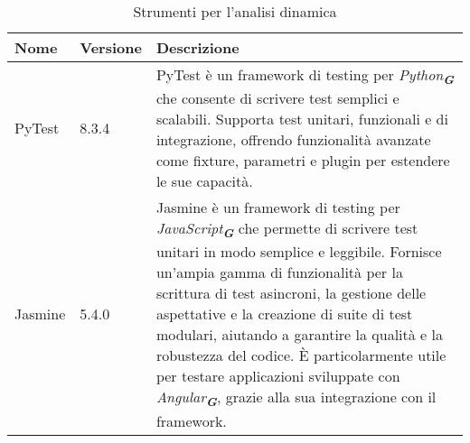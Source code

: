 \newpage

\begin{table}[h!]
    \centering
    \renewcommand{\arraystretch}{1.6} %
    \begin{tabularx}{\textwidth}{|p{2cm}|p{2cm}|X|} \hline
    \rowcolor[HTML]{FFD700} 
    \textbf{Nome} & \textbf{Versione} & \textbf{Descrizione} \\ \hline
    PyTest & 8.3.4 & PyTest è un framework di testing per \emph{Python}\textsubscript{\textbf{\textit{G}}} che consente di scrivere
                    test semplici e scalabili. 
                    Supporta test unitari, funzionali e di integrazione, offrendo funzionalità avanzate come fixture, parametri e
                    plugin per estendere le sue capacità. \\ \hline
    Jasmine & 5.4.0 & Jasmine è un framework di testing per \emph{JavaScript}\textsubscript{\textbf{\textit{G}}} che permette di
                      scrivere test unitari in modo semplice e leggibile. 
                      Fornisce un'ampia gamma di funzionalità per la scrittura di test asincroni, la gestione delle aspettative e
                      la creazione di suite di test modulari, aiutando a garantire la qualità e la robustezza del codice. 
                      È particolarmente utile per testare applicazioni sviluppate con \emph{Angular}\textsubscript{\textbf{\textit{G}}}, 
                      grazie alla sua integrazione con il framework. \\ \hline
    \end{tabularx}
    \caption{Strumenti per l’analisi dinamica}
\end{table}
